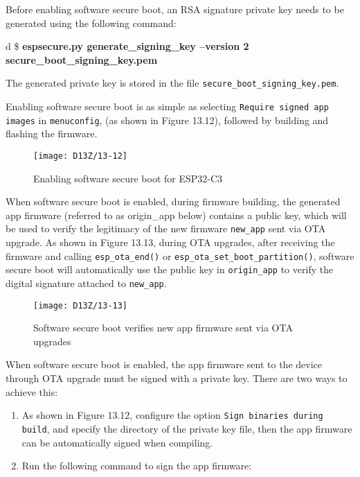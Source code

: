 \documentclass[a4paper,12pt]{book}
\begin{document}
Before enabling software secure boot, an RSA signature private key needs to be generated using the following command:

\begin{codebloc}
\begin{tabular}{d}
\$ \textbf{espsecure.py generate\_signing\_key --version 2 secure\_boot\_signing\_key.pem}
\end{tabular}
\end{codebloc}

The generated private key is stored in the file \verb|secure_boot_signing_key.pem|.

Enabling software secure boot is as simple as selecting \verb|Require signed app images| in \verb|menuconfig|, (as shown in Figure 13.12), followed by building and flashing the firmware.

\begin{figure}[!h]
    \centering
    \texttt{[image: D13Z/13-12]}
    \caption{Enabling software secure boot for ESP32-C3}
\end{figure}

When software secure boot is enabled, during firmware building, the generated app firmware (referred to as origin\_app below) contains a public key, which will be used to verify the legitimacy of the new firmware \verb|new_app| sent via OTA upgrade. As shown in Figure 13.13, during OTA upgrades, after receiving the firmware and calling \verb|esp_ota_end()| or \verb|esp_ota_set_boot_partition()|, software secure boot will automatically use the public key in \verb|origin_app| to verify the digital signature attached to \verb|new_app|.

\begin{figure}[!h]
    \centering
    \texttt{[image: D13Z/13-13]}
    \caption{Software secure boot verifies new app firmware sent via OTA upgrades}
\end{figure}

When software secure boot is enabled, the app firmware sent to the device through OTA upgrade must be signed with a private key. There are two ways to achieve this:

\begin{enumerate}[label=(\arabic*)]
    \item As shown in Figure 13.12, configure the option \verb|Sign binaries during build|, and specify the directory of the private key file, then the app firmware can be automatically signed when compiling.
    \item Run the following command to sign the app firmware:
\end{enumerate}
\end{document}
